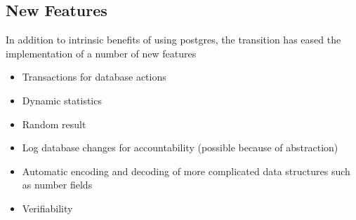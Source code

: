 \documentclass{article}
\begin{document}
\subsection{New Features}

In addition to intrinsic benefits of using postgres, the transition has eased the implementation of a number of new features
\begin{itemize}
\item Transactions for database actions
\item Dynamic statistics
\item Random result
\item Log database changes for accountability (possible because of abstraction)
\item Automatic encoding and decoding of more complicated data structures such as number fields
\item Verifiability
\end{itemize}
\end{document}
